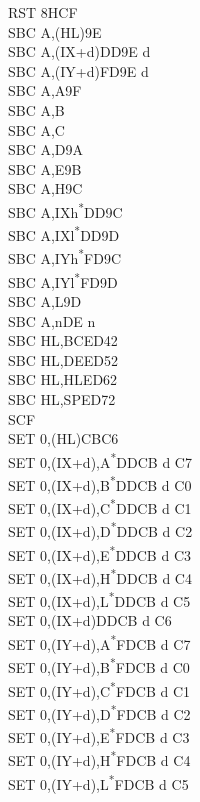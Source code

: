 \documentclass[twoside,openright,a4paper]{book}
\begin{document}
\begin{multicols}{3}
{\begin{tabbing}
	RST 8H\>CF\\
	SBC A,(HL)\>9E\\
	SBC A,(IX+d)\>DD9E d\\
	SBC A,(IY+d)\>FD9E d\\
	SBC A,A\>9F\\
	SBC A,B\\
	SBC A,C\\
	SBC A,D\>9A\\
	SBC A,E\>9B\\
	SBC A,H\>9C\\
	SBC A,IXh\textsuperscript{*}\>DD9C\\
	SBC A,IXl\textsuperscript{*}\>DD9D\\
	SBC A,IYh\textsuperscript{*}\>FD9C\\
	SBC A,IYl\textsuperscript{*}\>FD9D\\
	SBC A,L\>9D\\
	SBC A,n\>DE n\\
	SBC HL,BC\>ED42\\
	SBC HL,DE\>ED52\\
	SBC HL,HL\>ED62\\
	SBC HL,SP\>ED72\\
	SCF\\
	SET 0,(HL)\>CBC6\\
	SET 0,(IX+d),A\textsuperscript{*}\>DDCB d C7\\
	SET 0,(IX+d),B\textsuperscript{*}\>DDCB d C0\\
	SET 0,(IX+d),C\textsuperscript{*}\>DDCB d C1\\
	SET 0,(IX+d),D\textsuperscript{*}\>DDCB d C2\\
	SET 0,(IX+d),E\textsuperscript{*}\>DDCB d C3\\
	SET 0,(IX+d),H\textsuperscript{*}\>DDCB d C4\\
	SET 0,(IX+d),L\textsuperscript{*}\>DDCB d C5\\
	SET 0,(IX+d)\>DDCB d C6\\
	SET 0,(IY+d),A\textsuperscript{*}\>FDCB d C7\\
	SET 0,(IY+d),B\textsuperscript{*}\>FDCB d C0\\
	SET 0,(IY+d),C\textsuperscript{*}\>FDCB d C1\\
	SET 0,(IY+d),D\textsuperscript{*}\>FDCB d C2\\
	SET 0,(IY+d),E\textsuperscript{*}\>FDCB d C3\\
	SET 0,(IY+d),H\textsuperscript{*}\>FDCB d C4\\
	SET 0,(IY+d),L\textsuperscript{*}\>FDCB d C5\\

\end{tabbing}}
\end{multicols}
\end{document}

